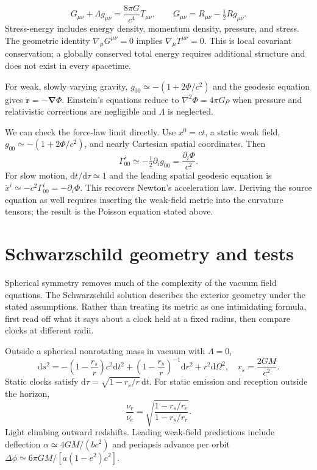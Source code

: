 \documentclass[11pt,oneside]{book}
\newcommand{\dd}{\mathrm{d}}
\newcommand{\vect}[1]{\boldsymbol{#1}}
\newcommand{\grad}{\boldsymbol{\nabla}}
\newcommand{\lap}{\nabla^2}
\theoremstyle{reviewstyle}
\begin{document}
\begin{equation}\boxed{G_{\mu\nu}+\Lambda g_{\mu\nu}=\frac{8\pi G}{c^4}T_{\mu\nu},\qquad G_{\mu\nu}=R_{\mu\nu}-\tfrac12Rg_{\mu\nu}.}\end{equation}
Stress-energy includes energy density, momentum density, pressure, and stress. The geometric identity $\nabla_\mu G^{\mu\nu}=0$ implies $\nabla_\mu T^{\mu\nu}=0$. This is local covariant conservation; a globally conserved total energy requires additional structure and does not exist in every spacetime.

For weak, slowly varying gravity, $g_{00}\simeq-(1+2\Phi/c^2)$ and the geodesic equation gives $\ddot{\vect r}=-\grad\Phi$. Einstein's equations reduce to $\lap\Phi=4\pi G\rho$ when pressure and relativistic corrections are negligible and $\Lambda$ is neglected.

We can check the force-law limit directly. Use $x^0=ct$, a static weak field, $g_{00}\simeq-(1+2\Phi/c^2)$, and nearly Cartesian spatial coordinates. Then
\begin{equation}
\Gamma^i_{00}\simeq-\tfrac12\partial_i g_{00}
=\frac{\partial_i\Phi}{c^2}.
\end{equation}
For slow motion, $\dd t/\dd\tau\simeq1$ and the leading spatial geodesic equation is $\ddot x^i\simeq-c^2\Gamma^i_{00}=-\partial_i\Phi$. This recovers Newton's acceleration law. Deriving the source equation as well requires inserting the weak-field metric into the curvature tensors; the result is the Poisson equation stated above.

\section{Schwarzschild geometry and tests}
Spherical symmetry removes much of the complexity of the vacuum field equations. The Schwarzschild solution describes the exterior geometry under the stated assumptions. Rather than treating its metric as one intimidating formula, first read off what it says about a clock held at a fixed radius, then compare clocks at different radii.

Outside a spherical nonrotating mass in vacuum with $\Lambda=0$,
\begin{equation}
\dd s^2=-\left(1-\frac{r_s}{r}\right)c^2\dd t^2+
\left(1-\frac{r_s}{r}\right)^{-1}\dd r^2+r^2\dd\Omega^2,\quad r_s=\frac{2GM}{c^2}.
\end{equation}
Static clocks satisfy $\dd\tau=\sqrt{1-r_s/r}\,\dd t$. For static emission and reception outside the horizon,
\begin{equation}\frac{\nu_r}{\nu_e}=\sqrt{\frac{1-r_s/r_e}{1-r_s/r_r}}.\end{equation}
Light climbing outward redshifts. Leading weak-field predictions include deflection $\alpha\simeq4GM/(bc^2)$ and periapsis advance per orbit
$\Delta\phi\simeq6\pi GM/[a(1-e^2)c^2]$.
\end{document}
